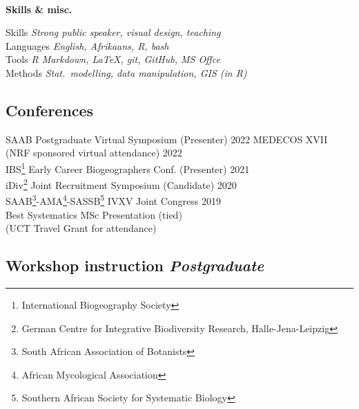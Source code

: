 \documentclass[10pt]{article}
\begin{document}
\begin{multicols}{2}
\

\textbf{Skills \& misc.} %

Skills         \hfill \textit{Strong public speaker, visual design, teaching} \\
Languages      \hfill \textit{                   English, Afrikaans, R, bash} \\
Tools          \hfill \textit{      R Markdown, LaTeX, git, GitHub, MS Offce} \\
Methods        \hfill \textit{Stat.~modelling, data manipulation, GIS (in R)} \\

\subsection*{Conferences} %

SAAB Postgraduate Virtual Symposium {\small (Presenter)} \hfill {\small 2022}                 
MEDECOS XVII {\small (NRF sponsored virtual attendance)} \hfill {\small       2022} \\
IBS\footnote{International
  Biogeography Society} Early Career
  Biogeographers Conf. {\small (Presenter)} \hfill {\small       2021} \\
iDiv\footnote{German Centre for
  Integrative Biodiversity Research,
  Halle-Jena-Leipzig} Joint Recruitment Symposium  {\small (Candidate)} \hfill {\small       2020} \\
SAAB\footnote{South African
  Association of Botanists}-AMA\footnote{African
  Mycological Association}-SASSB\footnote{Southern
  African Society for Systematic Biology} IVXV Joint Congress \hfill {\small 2019} \\
\hspace{2em} {\small Best Systematics MSc Presentation (tied)} \\
\hspace{2em} {\small(UCT Travel Grant for attendance)}

\subsection*{Workshop instruction %
                                 \hfill {\small \textmd{\textit{Postgraduate}}}}


\end{multicols}
\end{document}

